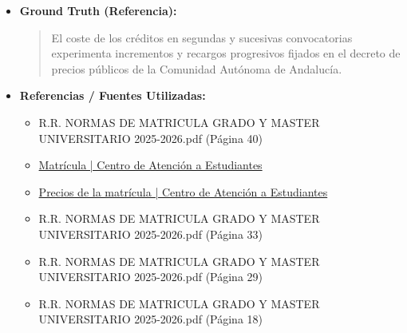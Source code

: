 \documentclass[12pt,a4paper,oneside]{report}
\begin{document}
\begin{itemize}
\begin{itemize}
\begin{quote}
\noindent\textbf{Cálculo del Coste del Crédito}\\

El cálculo del coste del crédito en una matrícula de segunda convocatoria en Grado en la Universidad de Sevilla se basa en el Decreto de Precios Públicos para las Universidades Públicas Andaluzas. Para obtener el coste exacto, es necesario consultar el decreto vigente o contactar directamente con la Universidad de Sevilla, ya que los precios pueden variar de un año académico a otro.


\noindent\textbf{Información Adicional}\\

\begin{itemize}
  \item La Universidad de Sevilla proporciona información detallada sobre los precios de matrícula en su sitio web oficial y a través del Centro de Atención a Estudiantes.
  \item Es importante verificar la información más reciente disponible, ya que los precios y las políticas pueden cambiar.
\end{itemize}
                \end{quote}
          \item \textbf{{Ground Truth (Referencia):}} \\
                \begin{quote}
El coste de los créditos en segundas y sucesivas convocatorias experimenta incrementos y recargos progresivos fijados en el decreto de precios públicos de la Comunidad Autónoma de Andalucía.
                \end{quote}
          \item \textbf{{Referencias / Fuentes Utilizadas:}} \\
                \begin{itemize}
                  \item R.R. NORMAS DE MATRICULA GRADO Y MASTER UNIVERSITARIO 2025-2026.pdf (Página 40)
                  \item \href{https://cat.us.es/matricula}{Matrícula | Centro de Atención a Estudiantes}
                  \item \href{https://cat.us.es/matricula/precios-de-la-matricula}{Precios de la matrícula | Centro de Atención a Estudiantes}
                  \item R.R. NORMAS DE MATRICULA GRADO Y MASTER UNIVERSITARIO 2025-2026.pdf (Página 33)
                  \item R.R. NORMAS DE MATRICULA GRADO Y MASTER UNIVERSITARIO 2025-2026.pdf (Página 29)
                  \item R.R. NORMAS DE MATRICULA GRADO Y MASTER UNIVERSITARIO 2025-2026.pdf (Página 18)
                \end{itemize}
        \end{itemize}


\end{itemize}
\end{document}
